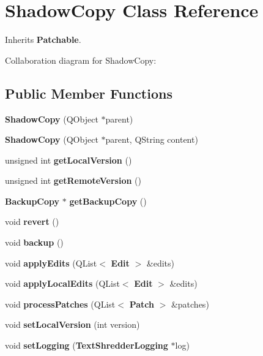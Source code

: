 \section{ShadowCopy Class Reference}
\label{class_shadow_copy}


Inherits {\bf Patchable}.



Collaboration diagram for ShadowCopy:
\subsection*{Public Member Functions}
\begin{DoxyCompactItemize}
\item 
{\bfseries ShadowCopy} (QObject $\ast$parent)\label{class_shadow_copy_a113c966f7daed0ffb99f7a57561a7801}

\item 
{\bfseries ShadowCopy} (QObject $\ast$parent, QString content)\label{class_shadow_copy_ac5fc9ad047d2690a72ab538dcd6ab4f7}

\item 
unsigned int {\bfseries getLocalVersion} ()\label{class_shadow_copy_a53ea25db19b20a6770e60d81a6b507f4}

\item 
unsigned int {\bfseries getRemoteVersion} ()\label{class_shadow_copy_a4bfafd0823dbc2788c936608ec22ea54}

\item 
{\bf BackupCopy} $\ast$ {\bfseries getBackupCopy} ()\label{class_shadow_copy_a5ed0b6e1f144468afca9129449a35fbc}

\item 
void {\bf revert} ()
\item 
void {\bf backup} ()
\item 
void {\bf applyEdits} (QList$<$ {\bf Edit} $>$ \&edits)
\item 
void {\bfseries applyLocalEdits} (QList$<$ {\bf Edit} $>$ \&edits)\label{class_shadow_copy_a222d6d0835c4dea04c5f3d4a4ebf6e82}

\item 
void {\bf processPatches} (QList$<$ {\bf Patch} $>$ \&patches)
\item 
void {\bfseries setLocalVersion} (int version)\label{class_shadow_copy_a434a5dc5be342886362d005f98831fe0}

\item 
void {\bfseries setLogging} ({\bf TextShredderLogging} $\ast$log)\label{class_shadow_copy_af50ac8c141db70dc5a4311de5790ccf9}

\end{DoxyCompactItemize}


